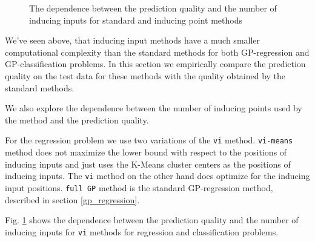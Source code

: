 % 			
% 			

% 			
% 			

\begin{figure}[!t]
	\centering
	\subfloat{
		\scalebox{0.8}{
			
		}
	}
	\subfloat{
		\scalebox{0.8}{
			
		}
	}
	\caption{The dependence between the prediction quality and the number of inducing inputs for standard and inducing point methods}
	\label{ind_vs_std}
\end{figure}


We've seen above, that inducing input methods have a much smaller computational complexity than the standard methods for both GP-regression and GP-classification problems. In this section we empirically compare the prediction quality on the test data for these methods with the quality obtained by the standard methods.

We also explore the dependence between the number of inducing points used by the method and the prediction quality.

For the regression problem we use two variations of the \lstinline{vi} method. \lstinline{vi-means} method does not maximize the lower bound with respect to the positions of inducing inputs and just uses the K-Means cluster centers as the positions of inducing inputs. The \lstinline{vi} method on the other hand does optimize for the inducing input positions. \lstinline{full GP} method is the standard GP-regression method, described in section \ref{gp_regression}.

Fig. \ref{ind_vs_std} shows the dependence between the prediction quality and the number of inducing inputs for \lstinline{vi} methods for regression and classification problems.

